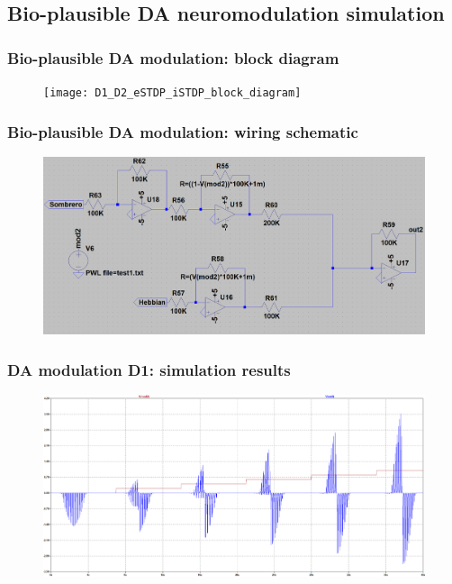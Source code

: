 \documentclass[12pt, aspectratio=169]{beamer}
\begin{document}
\subsection{Bio-plausible DA neuromodulation simulation}

\begin{frame}
\frametitle{Bio-plausible DA modulation: block diagram}
\begin{figure}
\texttt{[image: D1\_D2\_eSTDP\_iSTDP\_block\_diagram]}
\end{figure}
\end{frame}


\begin{frame}
\frametitle{Bio-plausible DA modulation: wiring schematic}
\begin{figure}
\includegraphics[width=0.85\linewidth]{schematicD1}
\end{figure}
\end{frame}


\begin{frame}
\frametitle{DA modulation D1: simulation results}
\begin{figure}
\includegraphics[width=0.8\linewidth]{resultD1v3.png}
\end{figure}
\end{frame}
\end{document}

